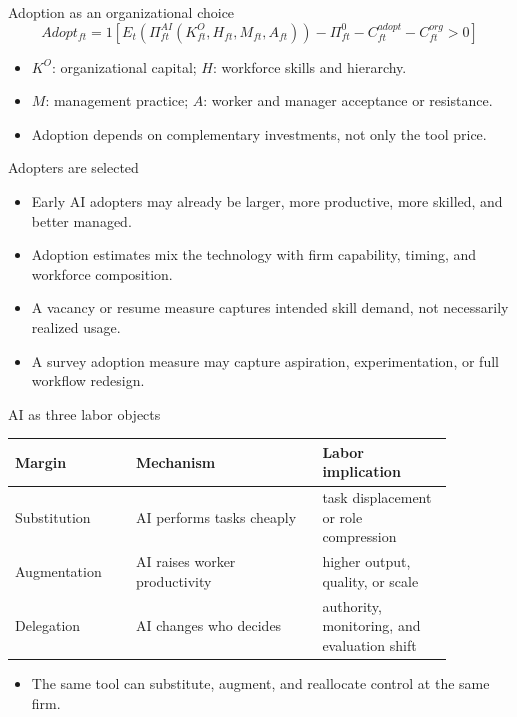\documentclass[aspectratio=169,11pt]{beamer}
\begin{document}
\begin{frame}{Adoption as an organizational choice}
\small
\[
Adopt_{ft}=1
\left[
E_t\left(\Pi_{ft}^{AI}(K_{ft}^{O}, H_{ft}, M_{ft}, A_{ft})\right)
- \Pi_{ft}^{0}
- C_{ft}^{adopt}
- C_{ft}^{org}
> 0
\right]
\]
\begin{itemize}
    \item $K^O$: organizational capital; $H$: workforce skills and hierarchy.
    \item $M$: management practice; $A$: worker and manager acceptance or resistance.
    \item Adoption depends on complementary investments, not only the tool price.
\end{itemize}
\end{frame}

\begin{frame}{Adopters are selected}
\begin{itemize}
    \item Early AI adopters may already be larger, more productive, more skilled, and better managed.
    \item Adoption estimates mix the technology with firm capability, timing, and workforce composition.
    \item A vacancy or resume measure captures intended skill demand, not necessarily realized usage.
    \item A survey adoption measure may capture aspiration, experimentation, or full workflow redesign.
\end{itemize}
\end{frame}

\begin{frame}{AI as three labor objects}
\small
\begin{tabular}{p{0.24\linewidth} p{0.37\linewidth} p{0.26\linewidth}}
\toprule
Margin & Mechanism & Labor implication \\
\midrule
Substitution & AI performs tasks cheaply & task displacement or role compression \\
Augmentation & AI raises worker productivity & higher output, quality, or scale \\
Delegation & AI changes who decides & authority, monitoring, and evaluation shift \\
\bottomrule
\end{tabular}
\vspace{0.35cm}
\begin{itemize}
    \item The same tool can substitute, augment, and reallocate control at the same firm.
\end{itemize}
\end{frame}
\end{document}
